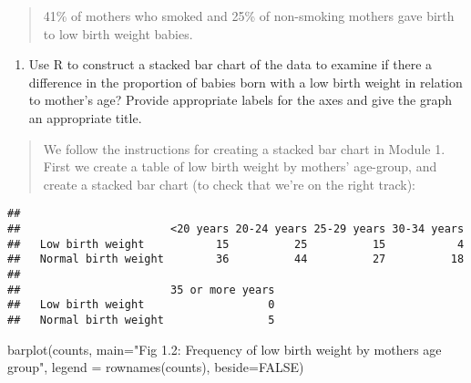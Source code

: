 \documentclass[
]{memoir}
\newenvironment{Shaded}{\begin{snugshade}}{\end{snugshade}}
\newcommand{\AttributeTok}[1]{\textcolor[rgb]{0.77,0.63,0.00}{#1}}
\newcommand{\ConstantTok}[1]{\textcolor[rgb]{0.00,0.00,0.00}{#1}}
\newcommand{\FunctionTok}[1]{\textcolor[rgb]{0.00,0.00,0.00}{#1}}
\newcommand{\NormalTok}[1]{#1}
\newcommand{\OtherTok}[1]{\textcolor[rgb]{0.56,0.35,0.01}{#1}}
\newcommand{\SpecialCharTok}[1]{\textcolor[rgb]{0.00,0.00,0.00}{#1}}
\newcommand{\StringTok}[1]{\textcolor[rgb]{0.31,0.60,0.02}{#1}}
\providecommand{\tightlist}{%
  \setlength{\itemsep}{0pt}\setlength{\parskip}{0pt}}
\begin{document}
\begin{quote}
41\% of mothers who smoked and 25\% of non-smoking mothers gave birth to low birth weight babies.
\end{quote}

\begin{enumerate}
\def\labelenumi{\alph{enumi})}
\setcounter{enumi}{2}
\tightlist
\item
  Use R to construct a stacked bar chart of the data to examine if there a difference in the proportion of babies born with a low birth weight in relation to mother's age? Provide appropriate labels for the axes and give the graph an appropriate title.
\end{enumerate}

\begin{quote}
We follow the instructions for creating a stacked bar chart in Module 1. First we create a table of low birth weight by mothers' age-group, and create a stacked bar chart (to check that we're on the right track):
\end{quote}

\begin{Shaded}
\end{Shaded}

\begin{verbatim}
##                      
##                       <20 years 20-24 years 25-29 years 30-34 years
##   Low birth weight           15          25          15           4
##   Normal birth weight        36          44          27          18
##                      
##                       35 or more years
##   Low birth weight                   0
##   Normal birth weight                5
\end{verbatim}

\begin{Shaded}
\begin{Highlighting}[]
\FunctionTok{barplot}\NormalTok{(counts, }
        \AttributeTok{main=}\StringTok{"Fig 1.2: Frequency of low birth weight by mother\textquotesingle{}s age group"}\NormalTok{,}
        \AttributeTok{legend =} \FunctionTok{rownames}\NormalTok{(counts), }\AttributeTok{beside=}\ConstantTok{FALSE}\NormalTok{)}
\end{Highlighting}
\end{Shaded}
\end{document}
